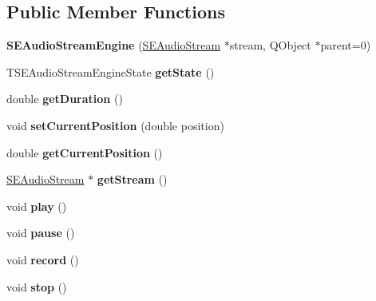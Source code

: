 \subsection*{Public Member Functions}
\begin{DoxyCompactItemize}
\item 
\hypertarget{class_s_e_audio_stream_engine_aa09fbccd738ff9c5da7dc892725ff0af}{{\bfseries S\+E\+Audio\+Stream\+Engine} (\hyperlink{class_s_e_audio_stream}{S\+E\+Audio\+Stream} $\ast$stream, Q\+Object $\ast$parent=0)}\label{class_s_e_audio_stream_engine_aa09fbccd738ff9c5da7dc892725ff0af}

\item 
\hypertarget{class_s_e_audio_stream_engine_a6b35e0ac97d167b2116e282607571bad}{T\+S\+E\+Audio\+Stream\+Engine\+State {\bfseries get\+State} ()}\label{class_s_e_audio_stream_engine_a6b35e0ac97d167b2116e282607571bad}

\item 
\hypertarget{class_s_e_audio_stream_engine_a2b339016ae6c29cc904228fd44ee01c6}{double {\bfseries get\+Duration} ()}\label{class_s_e_audio_stream_engine_a2b339016ae6c29cc904228fd44ee01c6}

\item 
\hypertarget{class_s_e_audio_stream_engine_a150f918934337e35e3d905441edf49e8}{void {\bfseries set\+Current\+Position} (double position)}\label{class_s_e_audio_stream_engine_a150f918934337e35e3d905441edf49e8}

\item 
\hypertarget{class_s_e_audio_stream_engine_a74e52f79b260973168c93a4bd8cfc9ce}{double {\bfseries get\+Current\+Position} ()}\label{class_s_e_audio_stream_engine_a74e52f79b260973168c93a4bd8cfc9ce}

\item 
\hypertarget{class_s_e_audio_stream_engine_aba880904dacd4ff95a6689fcd0517cf7}{\hyperlink{class_s_e_audio_stream}{S\+E\+Audio\+Stream} $\ast$ {\bfseries get\+Stream} ()}\label{class_s_e_audio_stream_engine_aba880904dacd4ff95a6689fcd0517cf7}

\item 
\hypertarget{class_s_e_audio_stream_engine_a216867458e22624b0ac08ffa98c5fa31}{void {\bfseries play} ()}\label{class_s_e_audio_stream_engine_a216867458e22624b0ac08ffa98c5fa31}

\item 
\hypertarget{class_s_e_audio_stream_engine_adf3e9101e926e949a2d3d79642810592}{void {\bfseries pause} ()}\label{class_s_e_audio_stream_engine_adf3e9101e926e949a2d3d79642810592}

\item 
\hypertarget{class_s_e_audio_stream_engine_acdfd6d3c3ff61a0c62efacbea6648158}{void {\bfseries record} ()}\label{class_s_e_audio_stream_engine_acdfd6d3c3ff61a0c62efacbea6648158}

\item 
\hypertarget{class_s_e_audio_stream_engine_a4e03579a7199bd59954a9a30b37805c4}{void {\bfseries stop} ()}\label{class_s_e_audio_stream_engine_a4e03579a7199bd59954a9a30b37805c4}

\end{DoxyCompactItemize}
